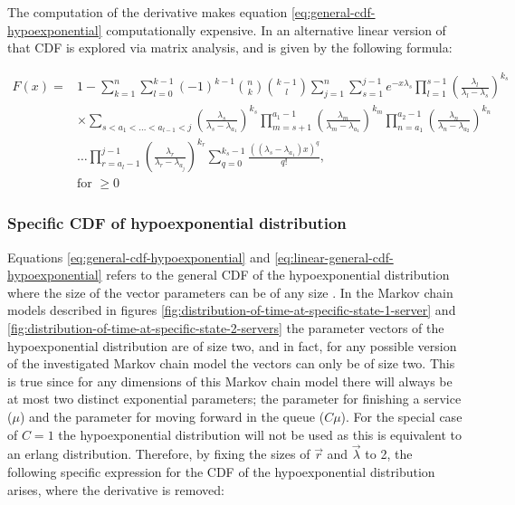 The computation of the derivative makes equation \ref{eq:general-cdf-hypoexponential}
computationally expensive. 
In \cite{Legros2015} an alternative linear version of that CDF is explored via 
matrix analysis, and is given by the following formula:

\begin{equation} \label{eq:linear-general-cdf-hypoexponential}
    \begin{split}
        F(x) = &1 - \sum_{k=1}^{n} \sum_{l=0}^{k-1} (-1)^{k-1} \binom{n}{k} 
            \binom{k-1}{l} \sum_{j=1}^{n} \sum_{s=1}^{j-1} e^{-x \lambda_s} 
            \prod_{l=1}^{s-1} \left( \frac{\lambda_l}{\lambda_l - \lambda_s} \right)
            ^ {k_s} \\
        & \times \sum_{s < a_1 < \dots < a_{l-1} < j} 
            \left( \frac{\lambda_s}{\lambda_s - \lambda_{a_1}} \right) ^ {k_s}
            \prod_{m=s+1}^{a_1-1} \left( \frac{\lambda_m}{\lambda_m - 
            \lambda_{a_1}}\right) ^ {k_m}  
            \prod_{n=a_1}^{a_2-1} \left( \frac{\lambda_n}{\lambda_n - 
            \lambda_{a_2}}\right) ^ {k_n} \\
        & \dots \prod_{r=a_l-1}^{j-1} \left( \frac{\lambda_r}{\lambda_r - 
            \lambda_{a_j}}\right) ^ {k_r}  
            \sum_{q=0}^{k_s - 1} \frac{((\lambda_s - \lambda_{a_1})x)^q}{q!}, \\
        & \text{for } \geq 0
    \end{split}
\end{equation}


\subsubsection{Specific CDF of hypoexponential distribution}
Equations \ref{eq:general-cdf-hypoexponential} and 
\ref{eq:linear-general-cdf-hypoexponential} refers to the general CDF of the
hypoexponential distribution where the size of the vector parameters can be of
any size \cite{Favaro2010}.
In the Markov chain models described in figures 
\ref{fig:distribution-of-time-at-specific-state-1-server} and 
\ref{fig:distribution-of-time-at-specific-state-2-servers} the parameter vectors 
of the hypoexponential distribution are of size two, and in fact, for any 
possible version of the investigated Markov chain model the vectors can only be 
of size two.
This is true since for any dimensions of this Markov chain model there will 
always be at most two distinct exponential parameters; the parameter for 
finishing a service (\(\mu\)) and the parameter for moving forward in the queue 
(\(C \mu\)). 
For the special case of \(C=1\) the hypoexponential distribution will not be 
used as this is equivalent to an erlang distribution.
Therefore, by fixing the sizes of \(\vec{r}\) and \(\vec{\lambda}\) to 2, the 
following specific expression for the CDF of the hypoexponential distribution
arises, where the derivative is removed:


